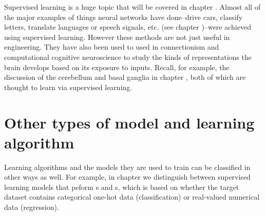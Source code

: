 Supervised learning is a huge topic that will be covered in chapter . Almost all of the major examples of things neural networks have done--drive cars, classify letters, translate languages or speech signals, etc. (see chapter )--were achieved using supervised learning. However these methods are not just useful in engineering. They have also been used to used in connectionism and computational cognitive neuroscience to study the kinds  of representations the brain develops based on its exposure to inputs. Recall, for example, the discussion of the cerebellum and basal ganglia in chapter , both of which are thought to learn via supervised learning.

\section{Other types of model and learning algorithm}

Learning algorithms and the models they are used to train can be classified in other ways as well. For example, in chapter  we distinguish between supervised learning models that peform s and s, which is based on whether the target dataset contains categorical one-hot data (classification) or real-valued numerical data (regression).  

